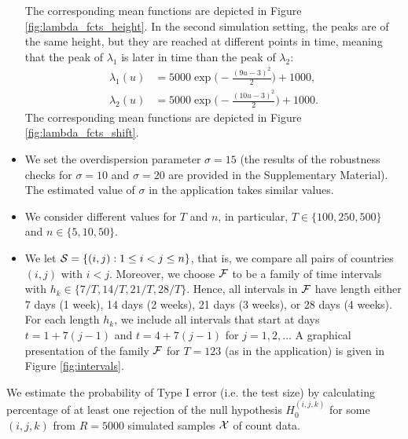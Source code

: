 \documentclass[a4paper,12pt]{article}
\numberwithin{equation}{section}
\begin{document}
\begin{itemize}[leftmargin=0.45cm]
The corresponding mean functions are depicted in Figure \ref{fig:lambda_fcts_height}. In the second simulation setting, the peaks are of the same height, but they are reached at different points in time, meaning that the peak of $\lambda_1$ is later in time than the peak of $\lambda_2$:
\begin{align*}
\lambda_1(u) &= 5000 \exp\Big(-\frac{(9 u-3)^2}{2}\Big) + 1000,\\
\lambda_2(u) &= 5000 \exp\Big(-\frac{(10 u-3)^2}{2}\Big) + 1000.
\end{align*}
The corresponding mean functions are depicted in Figure \ref{fig:lambda_fcts_shift}.

\item We set the overdispersion parameter $\sigma = 15$ (the results of the robustness checks for $\sigma=10$ and $\sigma=20$ are provided in the Supplementary Material). The estimated value of $\sigma$ in the application takes similar values.

\item We consider different values for $T$ and $n$, in particular, $T \in \{100,250, 500\}$ and $n \in \{5,10,50\}$. 

\item We let $\mathcal{S} = \{ (i,j): 1 \le i < j \le n\}$, that is, we compare all pairs of countries $(i,j)$ with $i < j$. Moreover, we choose $\mathcal{F}$ to be a family of time intervals with $h_k \in \{ 7/T,14/T,21/T,28/T \}$. Hence, all intervals in $\mathcal{F}$ have length either 7 days (1 week), 14 days (2 weeks), 21 days (3 weeks), or 28 days (4 weeks). For each length $h_k$, we include all intervals that start at days $t = 1 + 7(j-1)$ and $t = 4 + 7(j-1)$ for $j=1,2,\ldots$ A graphical presentation of the family $\mathcal{F}$ for $T = 123$ (as in the application) is given in Figure \ref{fig:intervals}. 

\end{itemize}
We estimate the probability of Type I error (i.e. the test size) by calculating percentage of at least one rejection of the null hypothesis $H_0^{(i, j, k)}$ for some $(i, j, k)$ from $R=5 000$ simulated samples $\mathcal{X}$ of count data.
\end{document}
